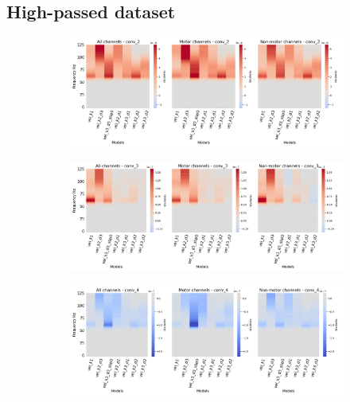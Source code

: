\subsection*{High-passed dataset}\label{subsec:vel-high-passed-dataset-appendixD}
\begin{figure}[!htpb]
\centering
\begin{subfigure}[b]{\textwidth}
   \includegraphics[width=1\linewidth]{img/appendix/D/conv-2/hp-sm/vel_model_gradients_all_kinds}
   \caption{}
   \label{fig:vel-pw-hp-grads-conv-2}
\end{subfigure}

\begin{subfigure}[b]{\textwidth}
   \includegraphics[width=1\linewidth]{img/appendix/D/conv-3/hp-m/vel_model_gradients_all_kinds}
   \caption{}
   \label{fig:vel-pw-hp-grads-conv-3}
\end{subfigure}

\begin{subfigure}[b]{\textwidth}
   \includegraphics[width=1\linewidth]{img/appendix/D/conv-4/hp-m/vel_model_gradients_all_kinds}
   \caption{}
   \label{fig:vel-pw-hp-grads-conv-4}
\end{subfigure}


\end{figure}
